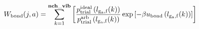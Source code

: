 \documentclass[12pt]{article}
\begin{document}
\begin{displaymath}
W_{\rm bond}(j,a) 
= 
\sum_{k=1}^{\bf nch\_vib}
{
\left[
{{p_{\rm trial}^{\rm ideal}\left(l_{\rm g_a,f}(k)\right)}\over{ p_{\rm trial}^{\rm arb}\left(l_{\rm g_a,f}(k)\right)}}
\exp\left[-\beta u_{\rm bond}\left(l_{\rm g_a,f}(k)\right)\right]
\right]
}
\end{displaymath}
\end{document}
